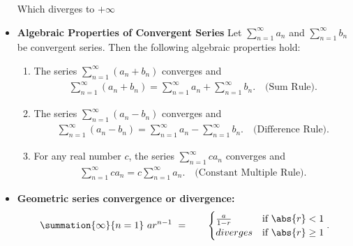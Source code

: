 \documentclass{report}
\begin{document}
\begin{itemize}
        Which diverges to $+\infty$
    \item \textbf{Algebraic Properties of Convergent Series}
        Let $ \sum_{n=1}^{\infty} a_n$ and $\sum_{n=1}^{\infty} b_n$ be convergent series. Then the following algebraic properties hold:
        \begin{enumerate}
            \item The series 
                $\sum_{n=1}^{\infty} (a_n + b_n)$ converges and 
                \begin{align*}
                    \sum_{n=1}^{\infty} (a_n + b_n) = \sum_{n=1}^{\infty} a_n + \sum_{n=1}^{\infty} b_n. \quad \text{(Sum Rule)}
                .\end{align*}
            \item The series $\sum_{n=1}^{\infty} (a_n - b_n)$ converges and 
                \begin{align*}
                    \sum_{n=1}^{\infty} (a_n - b_n) = \sum_{n=1}^{\infty} a_n - \sum_{n=1}^{\infty} b_n. \quad \text{(Difference Rule)}
                .\end{align*}
            \item For any real number \( c \), the series $\sum_{n=1}^{\infty} c a_n$ converges and 
                \begin{align*}
                    \sum_{n=1}^{\infty} c a_n = c \sum_{n=1}^{\infty} a_n. \quad \text{(Constant Multiple Rule)}
                .\end{align*}
        \end{enumerate}

    \item \textbf{Geometric series convergence or divergence: }
        \begin{align*}
            \summation{\infty}{n=1}\ ar^{n-1} \  = \quad \quad 
            \begin{cases}
                \frac{a}{1-r} & \text{if }  \abs{r} < 1\\
                diverges & \text{if }  \abs{r} \geq 1
            \end{cases}
        .\end{align*}


\end{itemize}
\end{document}
